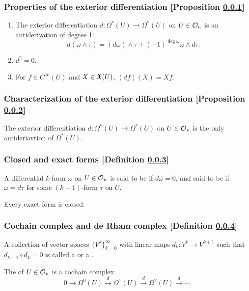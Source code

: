 \subsubsection{Properties of the exterior differentiation [Proposition \ref{properties-of-the-exterior-differentiation}]}\label{properties-of-the-exterior-differentiation}
\begin{enumerate}
\item The exterior differentiation $d \colon \Omega^*(U) \to \Omega^*(U)$ on $U \in \mathcal{O}_{n}$ is an antiderivation of degree 1:
\[
d(\omega \wedge \tau) = (d\omega)\wedge \tau + (-1)^{\deg \omega} \omega \wedge d \tau.
\]
\item $d^2 = 0$.
\item For $f \in C^\infty(U)$ and $X \in \mathfrak{X}(U)$, $(df)(X) = Xf$.
\end{enumerate}

\subsubsection{Characterization of the exterior differentiation [Proposition \ref{characterization-of-the-exterior-differentiation}]}\label{characterization-of-the-exterior-differentiation}
The exterior differentiation $d \colon \Omega^*(U) \to \Omega^*(U)$ on $U \in \mathcal{O}_{n}$ is the only antideriavtion of $\Omega^*(U)$.

\subsubsection{Closed and exact forms [Definition \ref{closed-and-exact-forms}]}\label{closed-and-exact-forms}
A differential $k$-form $\omega$ on $U \in \mathcal{O}_{n}$ is said to be  if $d\omega = 0$, and said to be  if $\omega = d \tau$ for some $(k-1)$-form $\tau$ on $U$.

Every exact form is closed.

\subsubsection{Cochain complex and de Rham complex [Definition \ref{cochain-complex-and-de-rham-complex}]}\label{cochain-complex-and-de-rham-complex}
A collection of vector spaces $\{ V^k \}_{k=0}^\infty$ with linear maps $d_k \colon V^k \to V^{k+1}$ such that $d_{k+1} \circ d_k = 0$ is called a  or a .

The  of $U \in \mathcal{O}_{n}$ is a cochain complex
\[
0 \rightarrow \Omega^0 (U) \xrightarrow{d} \Omega^1(U) \xrightarrow{d} \Omega^2 (U) \xrightarrow{d} \cdots.
\]

